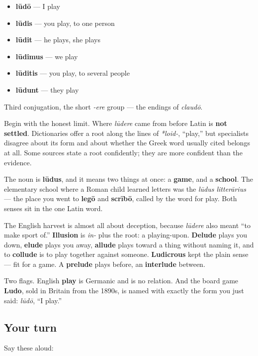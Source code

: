 \begin{itemize}
\raggedright
  \item \textbf{lūdō} — I play
  \item \textbf{lūdis} — you play, to one person
  \item \textbf{lūdit} — he plays, she plays
  \item \textbf{lūdimus} — we play
  \item \textbf{lūditis} — you play, to several people
  \item \textbf{lūdunt} — they play
\end{itemize}

Third conjugation, the short \emph{-ere} group — the endings of \emph{claudō}.

\begin{cousinweb}
Begin with the honest limit. Where \emph{lūdere} came from before Latin is \textbf{not settled}. Dictionaries offer a root along the lines of \emph{*loid-}, \textquotedblleft{}play,\textquotedblright{} but specialists disagree about its form and about whether the Greek word usually cited belongs at all. Some sources state a root confidently; they are more confident than the evidence.

The noun is \textbf{lūdus}, and it means two things at once: a \textbf{game}, and a \textbf{school}. The elementary school where a Roman child learned letters was the \emph{lūdus litterārius} — the place you went to \textbf{legō} and \textbf{scrībō}, called by the word for play. Both senses sit in the one Latin word.

The English harvest is almost all about deception, because \emph{lūdere} also meant \textquotedblleft{}to make sport of.\textquotedblright{} \textbf{Illusion} is \emph{in-} plus the root: a playing-upon. \textbf{Delude} plays you down, \textbf{elude} plays you away, \textbf{allude} plays toward a thing without naming it, and to \textbf{collude} is to play together against someone. \textbf{Ludicrous} kept the plain sense — fit for a game. A \textbf{prelude} plays before, an \textbf{interlude} between.

Two flags. English \textbf{play} is Germanic and is no relation. And the board game \textbf{Ludo}, sold in Britain from the 1890s, is named with exactly the form you just said: \emph{lūdō}, \textquotedblleft{}I play.\textquotedblright{}
\end{cousinweb}

\subsection*{Your turn}
Say these aloud:

